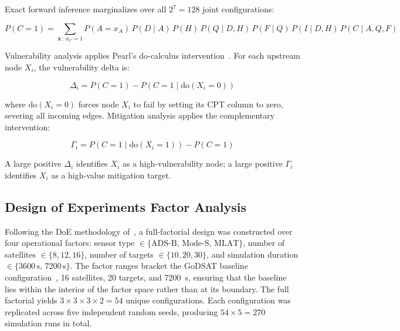\documentclass[]{spie}
\begin{document}
Exact forward inference marginalizes over all $2^7 = 128$ joint configurations:

\begin{equation}
    P(C{=}1) = \sum_{\mathbf{x} \,:\, x_C = 1}
    P(A{=}x_A)\, P(D{\mid}A)\, P(H)\, 
    P(Q{\mid}D,H)\, P(F{\mid}Q)\, 
    P(I{\mid}D,H)\, P(C{\mid}A,Q,F)
    \label{eq:inference}
\end{equation}

Vulnerability analysis applies Pearl's do-calculus intervention~\cite{Koller2009}. 
For each upstream node $X_i$, the vulnerability delta is:

\begin{equation}
    \Delta_i = P(C{=}1) - 
    P\!\left(C{=}1 \mid \mathrm{do}(X_i{=}0)\right)
    \label{eq:delta}
\end{equation}

where $\mathrm{do}(X_i{=}0)$ forces node $X_i$ to fail by setting its CPT column to 
zero, severing all incoming edges. Mitigation analysis applies the complementary 
intervention:

\begin{equation}
    \Gamma_i = P\!\left(C{=}1 \mid 
    \mathrm{do}(X_i{=}1)\right) - P(C{=}1)
    \label{eq:mitigation}
\end{equation}

A large positive $\Delta_i$ identifies $X_i$ as a high-vulnerability node; a large 
positive $\Gamma_i$ identifies $X_i$ as a high-value mitigation target.

\subsection{Design of Experiments Factor Analysis}
\label{sec:doe}

Following the DoE methodology of~\cite{Saeed2025DOEFramework}, a full-factorial design was constructed over four operational factors: sensor type $\in \{\mathrm{ADS\text{-}B},\, \mathrm{Mode\text{-}S},\, \mathrm{MLAT}\}$, number of satellites $\in \{8, 12, 16\}$, number of targets $\in \{10, 20, 30\}$, and simulation duration $\in \{3600\,\mathrm{s},\, 7200\,\mathrm{s}\}$. The factor ranges bracket the GoDSAT baseline configuration~\cite{Saeed2026GoDSATRL}, 16 satellites, 20 targets, and 7200~s, ensuring that the baseline lies within the interior of the factor space rather than at its boundary. The full factorial yields $3 \times 3 \times 3 \times 2 = 54$ unique configurations. Each configuration was replicated across five independent random seeds, producing $54 \times 5 = 270$ simulation runs in total.
\end{document}
